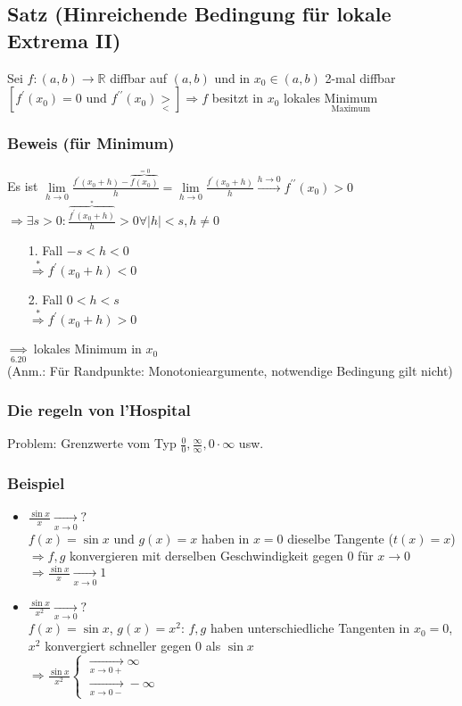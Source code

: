 \documentclass[12pt, titlepage]{article}
\newcommand{\R}{\mathds{R}}
\renewcommand{\>}{\rightarrow}
\renewcommand{\*}{\cdot}
\begin{document}
	\subsection{Satz (Hinreichende Bedingung für lokale Extrema II)}
	Sei $f\colon(a,b)\>\R$ diffbar auf $(a,b)$ und in $x_0\in(a,b)$ 2-mal diffbar\\
	$[f^\prime(x_0)=0\textrm{ und }f^{\prime\prime}(x_0)\underset{<}{>}]\Rightarrow f$ besitzt in $x_0$ lokales $\underset{\textrm{Maximum}}{\textrm{Minimum}}$
	\subsubsection*{Beweis (für Minimum)}
	Es ist $\lim\limits_{h\>0}\frac{f^\prime(x_0+h)-\overbrace{f(x_0)}^{=0}}{h}=\lim\limits_{h\>0}\frac{f^\prime(x_0+h)}{h}\overset{h\>0}{\>}f^{\prime\prime}(x_0)>0$\\
	$\Rightarrow \exists s>0\colon\frac{\overbrace{f^\prime(x_0+h)}^{*}}{h}>0\forall|h|<s,h\neq0$
	\begin{itemize}
		\item[1. Fall] $-s<h<0$\\
		$\overset{*}{\Rightarrow}f^\prime(x_0+h)<0$
		\item[2. Fall] $0<h<s$\\
		$\overset{*}{\Rightarrow}f^\prime(x_0+h)>0$
	\end{itemize}
	$\underset{\textrm{6.20}}{\Rightarrow}$ lokales Minimum in $x_0$\\
	(Anm.: Für Randpunkte: Monotonieargumente, notwendige Bedingung gilt nicht)
	\subsubsection*{Die regeln von l'Hospital}
	Problem: Grenzwerte vom Typ $\frac{0}{0},\frac{\infty}{\infty},0\*\infty$ usw.
	\subsubsection*{Beispiel}
	\begin{itemize}
		\item	$\frac{\sin x}{x}\underset{x\>0}{\>}?$\\
	$f(x)=\sin x$ und $g(x)=x$ haben in $x=0$ dieselbe Tangente ($t(x)=x$)\\
	$\Rightarrow f,g$ konvergieren mit derselben Geschwindigkeit gegen 0 für $x\>0$\\
	$\Rightarrow \frac{\sin x}{x}\underset{x\>0}{\>}1$
	\item $\frac{\sin x}{x^2}\underset{x\>0}{\>}?$\\
	$f(x)=\sin x$, $g(x)=x^2$: $f,g$ haben unterschiedliche Tangenten in $x_0=0$, $x^2$ konvergiert schneller gegen 0 als $\sin x$\\
	$\Rightarrow \frac{\sin x}{x^2}\begin{cases}
	\underset{x\>0+}{\>}\infty\\
	\underset{x\>0-}{\>}-\infty
	\end{cases}$
	\end{itemize}
\end{document}
